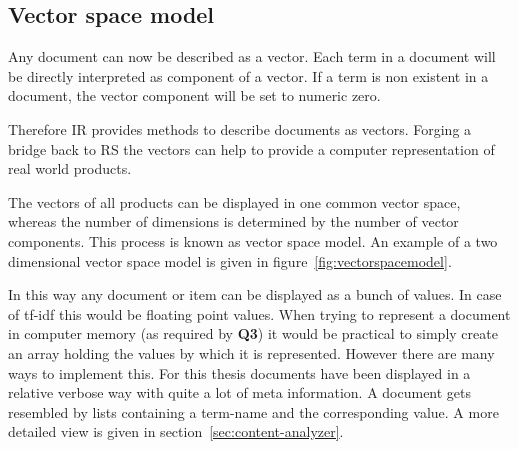 \subsection{Vector space model}
\label{sec:vectorspacemodel}
Any document can now be described as a vector.
Each term in a document will be directly interpreted as component of a vector.
If a term is non existent in a document, the vector component will be set to numeric zero.\citep[p.~120]{manning:2009}

Therefore IR provides methods to describe documents as vectors.
Forging a bridge back to RS the vectors can help to provide a computer representation of real world products.

The vectors of all products can be displayed in one common vector space, whereas the number of dimensions is determined by the number of vector components.
This process is known as vector space model.\citep[p.~120]{manning:2009}
An example of a two dimensional vector space model is given in figure~\ref{fig:vectorspacemodel}.


In this way any document or item can be displayed as a bunch of values.
In case of tf-idf this would be floating point values.
When trying to represent a document in computer memory (as required by \textbf{Q3}) it would be practical to simply create an array holding the values by which it is represented.
However there are many ways to implement this.
For this thesis documents have been displayed in a relative verbose way with quite a lot of meta information.
A document gets resembled by lists containing a term-name and the corresponding value.
A more detailed view is given in section~\ref{sec:content-analyzer}.

